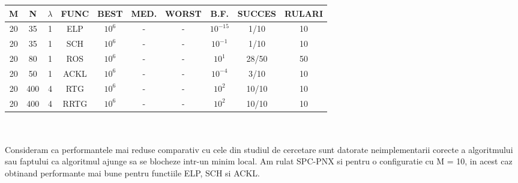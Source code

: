 \documentclass[a4paper]{article}
\begin{document}
\begin{enumerate}
\begin{tabular}{|c|c|c|c|c|c|c|c|c|c|}
\hline
M & N & $\lambda$ & FUNC & BEST & MED. & WORST & B.F. & SUCCES & RULARI\\
\hline
20 & 35 & 1 & ELP & $10^6$ & - & - & $10^{-15}$ & 1/10 & 10 \\
\hline
20 & 35 & 1 & SCH & $10^6$ & - & - & $10^{-1}$ & 1/10 & 10 \\
\hline
20 & 80 & 1 & ROS & $10^6$ & - & - & $10^{1}$ & 28/50 & 50 \\
\hline
20 & 50 & 1 & ACKL & $10^6$ & - & - & $10^{-4}$ & 3/10 & 10 \\
\hline
20 & 400 & 4 & RTG & $10^6$ & - & - & $10^{2}$ & 10/10 & 10 \\
\hline
20 & 400 & 4 & RRTG & $10^6$ & - & - & $10^{2}$ & 10/10 & 10 \\
\hline
\end{tabular}
\vspace{1mm}
\\ \\
Consideram ca performantele mai reduse comparativ cu cele din studiul de cercetare sunt datorate neimplementarii corecte a algoritmului sau faptului ca algoritmul ajunge sa se blocheze intr-un minim local. Am rulat SPC-PNX si pentru o configuratie cu M = 10, in acest caz obtinand performante mai bune pentru functiile ELP, SCH si ACKL.

\end{enumerate}
\end{document}

